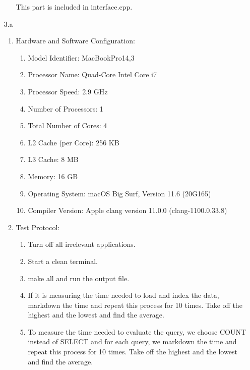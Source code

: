 \documentclass{article}
\begin{document}
\begin{enumerate}
\begin{enumerate}
This part is included in interface.cpp.

\end{enumerate}

\item[3.a]
\begin{enumerate}
\item 

Hardware and Software Configuration:

\begin{enumerate}
\item Model Identifier:	MacBookPro14,3

\item Processor Name:	Quad-Core Intel Core i7

\item Processor Speed:	2.9 GHz

\item Number of Processors:	1

\item Total Number of Cores:	4

\item L2 Cache (per Core):	256 KB

\item L3 Cache:	8 MB

\item Memory:	16 GB

\item Operating System: macOS Big Surf, Version 11.6 (20G165)

\item Compiler Version: Apple clang version 11.0.0 (clang-1100.0.33.8)

\end{enumerate}

\item Test Protocol:

\begin{enumerate}
\item Turn off all irrelevant applications.
\item Start a clean terminal.
\item make all and run the output file.
\item If it is measuring the time needed to load and index the
data, markdown the time and repeat this process for 10 times. Take off the highest and the lowest and find the average. 
\item To measure the time needed to evaluate the query, we choose COUNT instead of SELECT and for each query, we markdown the time and repeat this process for 10 times. Take off the highest and the lowest and find the average. 
\end{enumerate}


\end{enumerate}
\end{enumerate}
\end{document}
